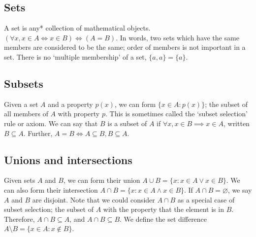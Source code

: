 \subsection{Sets}
A set is any* collection of mathematical objects.
\((\forall x, x \in A \iff x \in B) \iff (A = B)\).
In words, two sets which have the same members are considered to be the same; order of members is not important in a set.
There is no `multiple membership' of a set, \(\{ a, a \} = \{ a \}\).

\subsection{Subsets}
Given a set \(A\) and a property \(p(x)\), we can form \(\{ x \in A: p(x) \}\); the subset of all members of \(A\) with property \(p\).
This is sometimes called the `subset selection' rule or axiom.
We can say that \(B\) is a subset of \(A\) if \(\forall x, x \in B \implies x \in A\), written \(B \subseteq A\).
Further, \(A = B \iff A \subseteq B, B \subseteq A\).

\subsection{Unions and intersections}
Given sets \(A\) and \(B\), we can form their union \(A \cup B = \{ x: x \in A \lor x \in B \}\).
We can also form their intersection \(A \cap B = \{ x: x \in A \wedge x \in B \}\).
If \(A \cap B = \varnothing\), we say \(A\) and \(B\) are disjoint.
Note that we could consider \(A \cap B\) as a special case of subset selection; the subset of \(A\) with the property that the element is in \(B\).
Therefore, \(A \cap B \subseteq A\), and \(A \cap B \subseteq B\).
We define the set difference \(A \setminus B = \{ x \in A: x \notin B \}\).

